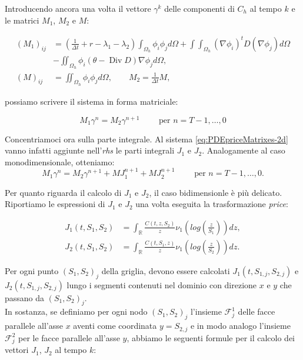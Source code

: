 \documentclass[a4paper,10pt]{report}
\theoremstyle{plain}
\theoremstyle{definition}
\theoremstyle{remark}
\DeclareMathOperator{\Div}{Div}
\begin{document}
Introducendo ancora una volta il vettore $\gamma^k$ delle componenti di $C_h$ al tempo $k$ e le matrici $M_1$, $M_2$ e $M$:

\begin{align*}
 (M_1)_{ij}&=\left(\frac{1}{\Delta t}+r-\lambda_1-\lambda_2\right)\int_{\Omega_h}\phi_i\phi_jd\Omega+\int\int_{\Omega_h}(\nabla\phi_i)^t D (\nabla\phi_j) d\Omega\\&
 -\iint_{\Omega_h}\phi_i(\theta-\Div D)\nabla\phi_j d\Omega,\\
 (M)_{ij}&=\iint_{\Omega_h}\phi_i\phi_j d\Omega, \qquad M_2=\frac{1}{\Delta t}M,
\end{align*}

possiamo scrivere il sistema in forma matriciale:

\begin{equation}
 \label{eq:PDEpriceMatrixes-2d}
 M_1 \gamma^n=M_2\gamma^{n+1} \qquad \text{ per } n=T-1,\dots,0
\end{equation}

Concentriamoci ora sulla parte integrale. Al sistema \eqref{eq:PDEpriceMatrixes-2d} vanno infatti aggiunte nell'\emph{rhs} le parti integrali $J_1$ e $J_2$. Analogamente al caso monodimensionale, otteniamo:
\begin{equation}
 \label{eq:PDEpriceMatrixeswithJ-2d}
 M_1 \gamma^n=M_2\gamma^{n+1}+MJ_1^{n+1}+MJ_2^{n+1}\qquad \text{ per } n=T-1,\dots,0.
\end{equation}

Per quanto riguarda il calcolo di $J_1$ e $J_2$, il caso bidimensionle è più delicato. Riportiamo le espressioni di $J_1$ e $J_2$ una volta eseguita la trasformazione \emph{price}:

\begin{align*}
 J_1(t,S_1,S_2)&= \int_\mathbb{R} \frac{C(t,z,S_2)}{z}\nu_1\left(log\left(\frac{z}{S_1}\right)\right)dz,\\
 J_2(t,S_1,S_2)&= \int_\mathbb{R} \frac{C(t,S_1,z)}{z}\nu_1\left(log\left(\frac{z}{S_2}\right)\right)dz.
\end{align*}

Per ogni punto $(S_1,S_2)_j$ della griglia, devono essere calcolati $J_1(t,S_{1,j},S_{2,j})$ e $J_2(t,S_{1,j},S_{2,j})$ lungo i segmenti contenuti nel dominio con direzione $x$ e $y$ che passano da $(S_1,S_2)_j$.\\
In sostanza, se definiamo per ogni nodo $(S_1,S_2)_j$ l'insieme $\mathcal{F}^1_j$ delle facce parallele all'asse $x$ aventi come coordinata $y=S_{2,j}$ e in modo analogo l'insieme $\mathcal{F}^2_j$ per le facce parallele all'asse $y$, abbiamo le seguenti formule per il calcolo dei vettori $J_1$, $J_2$ al tempo $k$:
\end{document}

